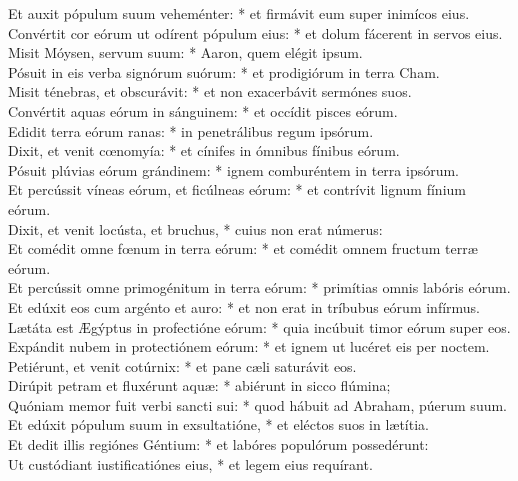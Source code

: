 {	Et auxit pópulum suum veheménter: * et firmávit eum super inimícos eius. \\
	Convértit cor eórum ut odírent pópulum eius: * et dolum fácerent in servos eius. \\
	Misit Móysen, servum suum: * Aaron, quem elégit ipsum. \\
	Pósuit in eis verba signórum suórum: * et prodigiórum in terra Cham. \\
	Misit ténebras, et obscurávit: * et non exacerbávit sermónes suos. \\
	Convértit aquas eórum in sánguinem: * et occídit pisces eórum. \\
	Edidit terra eórum ranas: * in penetrálibus regum ipsórum. \\
	Dixit, et venit cœnomyía: * et cínifes in ómnibus fínibus eórum. \\
	Pósuit plúvias eórum grándinem: * ignem comburéntem in terra ipsórum. \\
	Et percússit víneas eórum, et ficúlneas eórum: * et contrívit lignum fínium eórum. \\
	Dixit, et venit locústa, et bruchus, * cuius non erat númerus: \\
	Et comédit omne fœnum in terra eórum: * et comédit omnem fructum terræ eórum. \\
	Et percússit omne primogénitum in terra eórum: * primítias omnis labóris eórum. \\
	Et edúxit eos cum argénto et auro: * et non erat in tríbubus eórum infírmus. \\
	Lætáta est Ægýptus in profectióne eórum: * quia incúbuit timor eórum super eos. \\
	Expándit nubem in protectiónem eórum: * et ignem ut lucéret eis per noctem. \\
	Petiérunt, et venit cotúrnix: * et pane cæli saturávit eos. \\
	Dirúpit petram et fluxérunt aquæ: * abiérunt in sicco flúmina; \\
	Quóniam memor fuit verbi sancti sui: * quod hábuit ad Abraham, púerum suum. \\
	Et edúxit pópulum suum in exsultatióne, * et eléctos suos in lætítia. \\
	Et dedit illis regiónes Géntium: * et labóres populórum possedérunt: \\
	Ut custódiant iustificatiónes eius, * et legem eius requírant.
}

